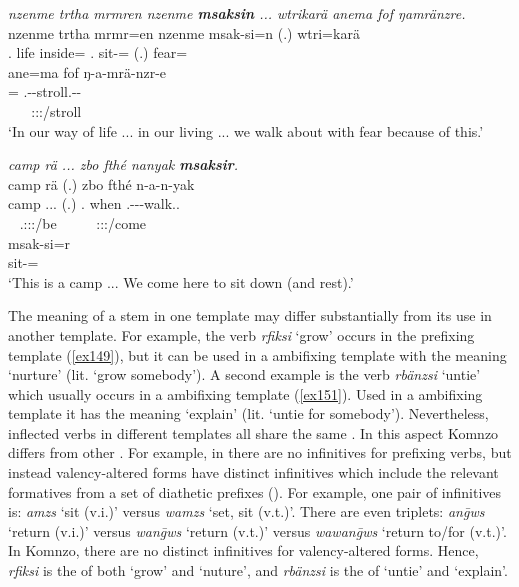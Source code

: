 \begin{exe}
	\ex \emph{nzenme trtha mrmren nzenme \textbf{msaksin} ... wtrikarä anema fof ŋamränzre.}\\
	\gll nzenme trtha mrmr=en nzenme msak-si=n (.) wtri=karä\\
	\Fnsg.{\Poss} life inside={\Loc} \Fnsg.{\Poss} sit-\Nmlz={\Loc} (.) fear={\Prop}\\
	\sn
	\glll ane=ma fof ŋ-a-mrä-nzr-e\\
	\Dem={\Char} {\Emph} \M.\Alph-\Vc-stroll.\Ext-\Ndu-{\Fnsg}\\
	~ ~ {\footnotesize \Fpl:\Sbj:\Nonpast:\Ipfv/stroll}\\
	\trans `In our way of life ... in our living ... we walk about with fear because of this.' 
	\label{ex324}
\end{exe}
\begin{exe}
	\ex \emph{camp rä ... zbo fthé nanyak \textbf{msaksir}.}\\
	\glll camp rä (.) zbo fthé n-a-n-yak\\
	camp \Tsg.\F.\Cop.{\Ndu} (.) \Prox.{\All} when \Fnsg.\Alph-\Vc-\Venit-walk.\Ext.{\Ndu}\\
	~ {\footnotesize \Tsg.\F:\Sbj:\Nonpast:\Ipfv/be} ~ ~ ~ {\footnotesize \Fpl:\Sbj:\Nonpast:\Ipfv/come}\\
	\sn
	\gll msak-si=r\\
	sit-\Nmlz={\Purp}\\
	\trans `This is a camp ... We come here to sit down (and rest).'
	\label{ex325}
\end{exe}

The meaning of a  stem in one template may differ substantially from its use in another template. For example, the verb \emph{rfiksi} `grow' occurs in the prefixing template (\ref{ex149}), but it can be used in a  ambifixing template with the meaning `nurture' (lit. `grow somebody'). A second example is the verb \emph{rbänzsi} `untie' which usually occurs in a  ambifixing template (\ref{ex151}). Used in a  ambifixing template it has the meaning `explain' (lit. `untie for somebody'). Nevertheless, inflected verbs in different templates all share the same . In this aspect Komnzo differs from other . For example, in  there are no infinitives for prefixing verbs, but instead valency-altered forms have distinct infinitives which include the relevant formatives from a set of diathetic prefixes (\citealt{Evans:2015wy}). For example, one pair of infinitives is: \emph{amzs} `sit (v.i.)' versus \emph{wamzs} `set, sit (v.t.)'. There are even triplets: \emph{an\={g}ws} `return (v.i.)' versus \emph{wan\={g}ws} `return (v.t.)' versus \emph{wawan\={g}ws} `return to/for (v.t.)'. In Komnzo, there are no distinct infinitives for valency-altered forms. Hence, \emph{rfiksi} is the  of both `grow' and `nuture', and \emph{rbänzsi} is the  of `untie' and `explain'.

